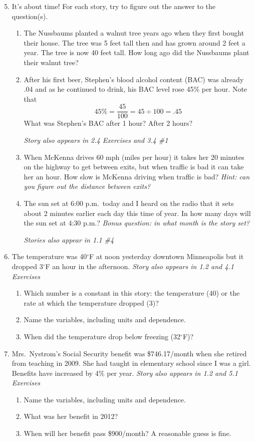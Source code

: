 \begin{enumerate} 
\setcounter{enumi}{4}

\item  It's about time!  For each story, try to figure out the answer to the question(s).
\begin{enumerate}
\item The Nussbaums planted a walnut tree years ago when they first bought their house.  The tree was 5 feet tall then and has grown around 2 feet a year. The tree is now 40 feet tall.  How long ago did the Nussbaums plant their walnut tree?
\item After his first beer, Stephen's blood alcohol content (BAC) was already .04 and as he continued to drink, his BAC level rose 45\% per hour.  Note that $$45\% = \frac{45}{100} = 45 \div 100 = .45$$  What was Stephen's BAC after 1 hour?  After 2 hours?

\hfill \emph{Story also appears in 2.4 Exercises and 3.4 \#1}
\item When McKenna drives 60 mph (miles per hour) it takes her 20 minutes on the highway to get between exits, but when traffic is bad it can take her an hour.  How slow is McKenna driving when traffic is bad?  \emph{Hint:  can you figure out the distance between exits?}
\item The sun set at 6:00 p.m.\ today and I heard on the radio that it sets about 2 minutes earlier each day this time of year.  In how many days will the sun set at 4:30 p.m.?
\emph{Bonus question:  in what month is the story set?}

 \hfill \emph{Stories also appear in 1.1 \#4}
\end{enumerate}  

\item The temperature was 40$^\circ$F at noon yesterday downtown Minneapolis but it dropped 3$^\circ$F an hour in the afternoon.   \hfill \emph{Story also appears in 1.2 and 4.1 Exercises}
 \begin{enumerate}
 \item Which number is a constant in this story: the temperature (40) or the rate at which the temperature dropped (3)?
\item Name the variables, including units and dependence. 
\item When did the temperature drop below freezing (32$^\circ$F)?
\end{enumerate}  

\item Mrs.\ Nystrom's Social Security benefit was \$746.17/month when she retired from teaching in 2009. She had taught in elementary school since I was a girl.   Benefits have increased by 4\% per year.   \hfill \emph{Story also appears in 1.2 and 5.1 Exercises} 
\begin{enumerate}
\item Name the variables, including units and dependence. 
\item What was her benefit in 2012?
\item When will her benefit pass \$900/month?  A reasonable guess is fine.  
\end{enumerate}  


\end{enumerate}
